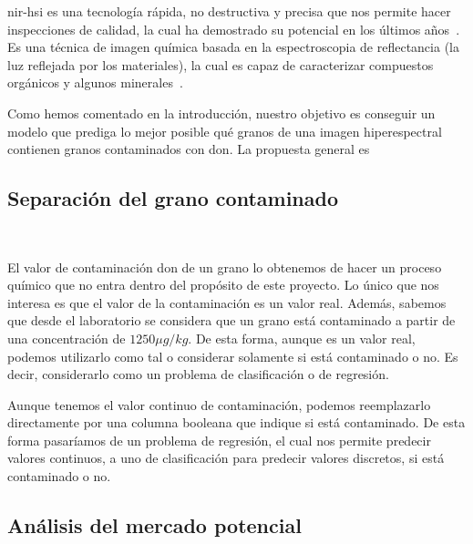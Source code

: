 \gls{nir-hsi} es una tecnología rápida, no destructiva y precisa que nos permite hacer inspecciones de calidad, la cual ha demostrado su potencial en los últimos años\ \cite{Applicat5:online}. 
Es una técnica de imagen química basada en la espectroscopia de reflectancia (la luz reflejada por los materiales), la cual es capaz de caracterizar compuestos orgánicos y 
algunos minerales\ \cite{NIRHyper23:online}.

Como hemos comentado en la introducción, nuestro objetivo es conseguir un modelo que prediga lo mejor posible qué granos de una \gls{imagen hiperespectral} contienen 
granos contaminados con \acrshort{don}. La propuesta general es 


\subsection{Separación del grano contaminado}\ \label{sec:separacion}




El valor de contaminación \gls{don} de un grano lo obtenemos de hacer un proceso químico que no entra dentro del propósito de este proyecto. 
Lo único que nos interesa es que el valor de la contaminación es un valor real. Además, sabemos que desde el laboratorio se considera que un grano está contaminado a 
partir de una concentración de \(1250 \mu g/kg\). De esta forma, aunque es un valor real, podemos utilizarlo como tal o considerar solamente si está contaminado o no. 
Es decir, considerarlo como un problema de \gls{clasificación} o de \gls{regresión}.

Aunque tenemos el valor continuo de contaminación, podemos reemplazarlo directamente por una columna booleana que indique si está contaminado. 
De esta forma pasaríamos de un problema de regresión, el cual nos permite predecir valores continuos, a uno de clasificación para predecir valores discretos, 
si está contaminado o no.

\subsection{Análisis del mercado potencial}





